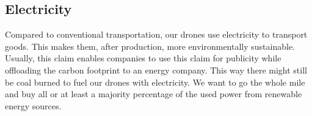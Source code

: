 \subsection{Electricity}
Compared to conventional transportation, our drones use electricity to transport goods. This makes them, after production, more environmentally sustainable. Usually, this claim enables companies to use this claim for publicity while offloading the carbon footprint to an energy company. This way there might still be coal burned to fuel our drones with electricity.
\newline
We want to go the whole mile and buy all or at least a majority percentage of the used power from renewable energy sources.
